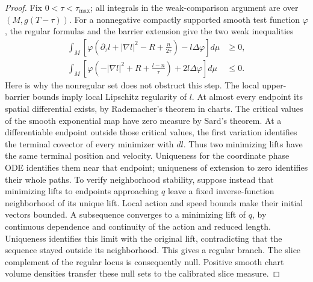 \begin{proof}
Fix $0<\tau<\tau_{\max}$; all integrals in the weak-comparison argument are over
$(M,g(T-\tau))$.  For a nonnegative compactly supported smooth test function $\varphi$, the
regular formulas and the barrier extension give the two weak inequalities
\begin{equation}\label{eq:reduced-weak-inequalities}
\begin{aligned}
 \int_M\!\left[\varphi\left(\partial_\tau l+|\nabla l|^2-R+\frac n{2\tau}\right)
 -l\Delta\varphi\right]d\mu&\geq0,\\
 \int_M\!\left[\varphi\left(-|\nabla l|^2+R+\frac{l-n}{\tau}\right)
 +2l\Delta\varphi\right]d\mu&\leq0.
\end{aligned}
\end{equation}
Here is why the nonregular set does not obstruct this step.  The local
upper-barrier bounds imply local Lipschitz regularity of $l$.  At almost
every endpoint its spatial differential exists, by Rademacher's theorem in
charts.  The critical values of the smooth exponential map have zero measure
by Sard's theorem.  At a differentiable endpoint outside those critical
values, the first variation identifies the terminal covector of every
minimizer with $dl$.  Thus two minimizing lifts have the same terminal
position and velocity.  Uniqueness for the coordinate phase ODE identifies
them near that endpoint; uniqueness of extension to zero identifies their
whole paths.  To verify neighborhood stability, suppose instead that
minimizing lifts to endpoints approaching $q$ leave a fixed inverse-function
neighborhood of its unique lift.  Local action and speed bounds make their
initial vectors bounded.  A subsequence converges to a minimizing lift of
$q$, by continuous dependence and continuity of the action and reduced length.
Uniqueness identifies this limit with the original lift, contradicting that
the sequence stayed outside its neighborhood.  This gives a regular branch.
The slice complement of the regular
locus is consequently null.  Positive smooth chart volume densities transfer
these null sets to the calibrated slice measure.


\end{proof}
